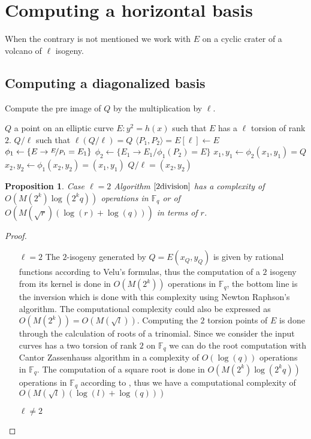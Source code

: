 \documentclass{article}
\theoremstyle{plain}
\newtheorem{prop}[thm]{Proposition}
\theoremstyle{definition}
\theoremstyle{remark}
\begin{document}
\section{Computing a horizontal basis}
When the contrary is  not mentioned we work with $E$ on a cyclic crater of a volcano of $\ell$ isogeny. 

\subsection{Computing a diagonalized basis}

\begin{algorithm}
\caption{\label{ldivision}Compute the pre image of $Q$ by the multiplication by $\ell$.}
\begin{algorithmic}[5]
\REQUIRE $Q$ a point on an elliptic curve $E: y^2=h(x)$ such that $E$ has a $\ell$ torsion of rank $2$.
\ENSURE $Q/\ell$ such that $\ell(Q/\ell)=Q$
\STATE $ \langle P_1,P_2 \rangle = E[\ell] \gets E $
\STATE $\phi_1  \gets \lbrace E\rightarrow \nicefrac{E}{P_1}=E_1 \rbrace $
\STATE $\phi_2  \gets \lbrace E_1\rightarrow {E_1}/{\phi_1(P_2)}=E \rbrace $
\STATE $x_1,y_1 \gets \phi_2(x_1,y_1)=Q $
\STATE $x_2,y_2 \gets \phi_1(x_2,y_2)=(x_1,y_1)  $
\RETURN $Q/\ell=(x_2,y_2)$
\end{algorithmic}
\end{algorithm}

\begin{prop}{Case $\ell=2$}
Algorithm $\ref{2division}$ has a complexity of $O(M(2^k)\log(2^kq))$ operations in $\mathbb{F}_q$ or of $O(M(\sqrt{r})(\log(r)+\log(q)))$ in terms of $r$.
\end{prop}

\begin{proof}
\begin{itemize}
\item[$\ell = 2$ ]
The $2$-isogeny generated by $Q=E(x_Q,y_Q)$ is given by rational functions according to Velu's formulas, thus the computation of a $2$ isogeny from its kernel is done in $O(M(2^k))$ operations in $\mathbb{F}_q$, the bottom line is the inversion which is done with this complexity using Newton Raphson's algorithm. The computational complexity could also be expressed as $O(M(2^k))=O(M(\sqrt{l}))$.
\newline
Computing the $2$ torsion points of $E$ is done through the calculation of roots of a trinomial.
Since we consider the input curves has a two torsion of rank $2$ on $\mathbb{F}_q$ we can do the root computation with Cantor Zassenhauss algorithm in a complexity of $O( \log(q))$ operations in $\mathbb{F}_q$. 
The computation of a square root is done in $O(M(2^k)\log(2^kq))$ operations in $\mathbb{F}_q$ according to \cite{DBLP:journals/dcc/DoliskaniS15}, thus we have a computational complexity of $O(M(\sqrt{l})(\log(l)+\log(q)))$
\item[$\ell \neq 2$]
\end{itemize}
\end{proof}
\end{document}
